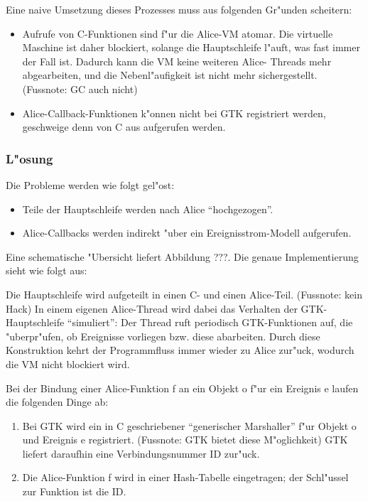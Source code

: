 \documentclass{article}
\begin{document}
Eine naive Umsetzung dieses Prozesses muss aus folgenden Gr"unden scheitern:

\begin{itemize}
\item Aufrufe von C-Funktionen sind f"ur die Alice-VM atomar. Die virtuelle
      Maschine ist daher blockiert, solange die Hauptschleife l"auft, 
      was fast immer der Fall ist. Dadurch kann die VM keine weiteren Alice-
      Threads mehr abgearbeiten, und die Nebenl"aufigkeit ist nicht mehr
      sichergestellt. (Fussnote: GC auch nicht)
\item Alice-Callback-Funktionen k"onnen nicht bei GTK registriert werden,
      geschweige denn von C aus aufgerufen werden.

\end{itemize}

\subsubsection{L"osung}

Die Probleme werden wie folgt gel"ost:

\begin{itemize}
\item Teile der Hauptschleife werden nach Alice ``hochgezogen''.
\item Alice-Callbacks werden indirekt "uber ein Ereignisstrom-Modell
      aufgerufen.
\end{itemize}

Eine schematische "Ubersicht liefert Abbildung ???.
Die genaue Implementierung sieht wie folgt aus:

Die Hauptschleife wird aufgeteilt in einen C- und einen Alice-Teil.
(Fussnote: kein Hack) In einem eigenen Alice-Thread wird dabei das Verhalten
der GTK-Hauptschleife ``simuliert'': Der Thread ruft periodisch
GTK-Funktionen auf, die "uberpr"ufen, ob Ereignisse vorliegen bzw. diese
abarbeiten. Durch diese Konstruktion kehrt der Programmfluss immer wieder
zu Alice zur"uck, wodurch die VM nicht blockiert wird.

Bei der Bindung einer Alice-Funktion f an ein Objekt o f"ur ein Ereignis e
laufen die folgenden Dinge ab:

\begin{enumerate}
\item Bei GTK wird ein in C geschriebener ``generischer Marshaller''
      f"ur Objekt o und Ereignis e registriert. (Fussnote: GTK bietet diese
      M"oglichkeit) GTK liefert daraufhin eine Verbindungsnummer ID zur"uck.
\item Die Alice-Funktion f wird in einer Hash-Tabelle eingetragen;
      der Schl"ussel zur Funktion ist die ID.
\end{enumerate}
\end{document}
